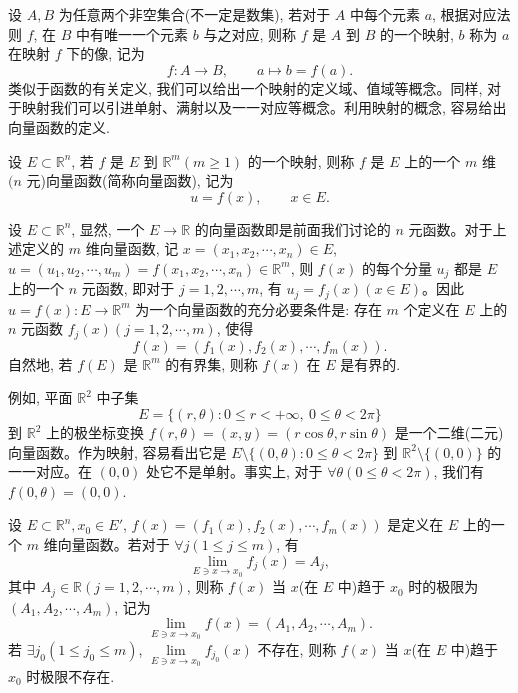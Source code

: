 设 $A,B$ 为任意两个非空集合(不一定是数集), 若对于 $A$ 中每个元素 $a$, 根据对应法则 $f$, 在 $B$ 中有唯一一个元素 $b$ 与之对应, 则称 $f$ 是 $A$ 到 $B$ 的一个映射, $b$ 称为 $a$ 在映射 $f$ 下的像, 记为
\[
  f:A\to B,\qquad a\mapsto b=f(a).
\]
类似于函数的有关定义, 我们可以给出一个映射的定义域、值域等概念。同样, 对于映射我们可以引进单射、满射以及一一对应等概念。利用映射的概念, 容易给出向量函数的定义.

\begin{definition}\label{definition:ma-13-2-4}
设 $E\subset\mathbb R^n$, 若 $f$ 是 $E$ 到 $\mathbb R^m(m\geqslant1)$ 的一个映射, 则称 $f$ 是 $E$ 上的一个 $m$ 维 $(n$ 元)向量函数(简称向量函数), 记为
\[
  u=f(x),\qquad x\in E.
\]
\end{definition}

设 $E\subset\mathbb R^n$, 显然, 一个 $E\to\mathbb R$ 的向量函数即是前面我们讨论的 $n$ 元函数。对于上述定义的 $m$ 维向量函数, 记 $x=(x_1,x_2,\cdots,x_n)\in E$, $u=(u_1,u_2,\cdots,u_m)=f(x_1,x_2,\cdots,x_n)\in\mathbb R^m$, 则 $f(x)$ 的每个分量 $u_j$ 都是 $E$ 上的一个 $n$ 元函数, 即对于 $j=1,2,\cdots,m$, 有 $u_j=f_j(x)(x\in E)$。因此 $u=f(x):E\to\mathbb R^m$ 为一个向量函数的充分必要条件是: 存在 $m$ 个定义在 $E$ 上的 $n$ 元函数 $f_j(x)(j=1,2,\cdots,m)$, 使得
\[
  f(x)=(f_1(x),f_2(x),\cdots,f_m(x)).
\]
自然地, 若 $f(E)$ 是 $\mathbb R^m$ 的有界集, 则称 $f(x)$ 在 $E$ 是有界的.

例如, 平面 $\mathbb R^2$ 中子集
\[
  E=\{(r,\theta):0\leqslant r<+\infty,\ 0\leqslant\theta<2\pi\}
\]
到 $\mathbb R^2$ 上的极坐标变换 $f(r,\theta)=(x,y)=(r\cos\theta,r\sin\theta)$ 是一个二维(二元)向量函数。作为映射, 容易看出它是 $E\setminus\{(0,\theta):0\leqslant\theta<2\pi\}$ 到 $\mathbb R^2\setminus\{(0,0)\}$ 的一一对应。在 $(0,0)$ 处它不是单射。事实上, 对于 $\forall\theta(0\leqslant\theta<2\pi)$, 我们有 $f(0,\theta)=(0,0)$.

\begin{definition}\label{definition:ma-13-2-5}
设 $E\subset\mathbb R^n,x_0\in E'$, $f(x)=(f_1(x),f_2(x),\cdots,f_m(x))$ 是定义在 $E$ 上的一个 $m$ 维向量函数。若对于 $\forall j(1\leqslant j\leqslant m)$, 有
\[
  \lim_{E\ni x\to x_0}f_j(x)=A_j,
\]
其中 $A_j\in\mathbb R(j=1,2,\cdots,m)$, 则称 $f(x)$ 当 $x$(在 $E$ 中)趋于 $x_0$ 时的极限为 $(A_1,A_2,\cdots,A_m)$, 记为
\[
  \lim_{E\ni x\to x_0}f(x)=(A_1,A_2,\cdots,A_m).
\]
若 $\exists j_0(1\leqslant j_0\leqslant m)$, $\lim\limits_{E\ni x\to x_0}f_{j_0}(x)$ 不存在, 则称 $f(x)$ 当 $x$(在 $E$ 中)趋于 $x_0$ 时极限不存在.
\end{definition}


